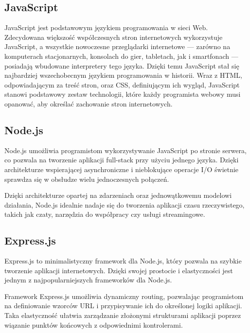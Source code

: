 \subsection{JavaScript}
JavaScript jest podstawowym językiem programowania w sieci Web. Zdecydowana większość współczesnych stron internetowych wykorzystuje JavaScript, a wszystkie nowoczesne przeglądarki internetowe — zarówno na komputerach stacjonarnych, konsolach do gier, tabletach, jak i smartfonach — posiadają wbudowane interpretery tego języka. Dzięki temu JavaScript stał się najbardziej wszechobecnym językiem programowania w historii. Wraz z HTML, odpowiadającym za treść stron, oraz CSS, definiującym ich wygląd, JavaScript stanowi podstawowy zestaw technologii, które każdy programista webowy musi opanować, aby określać zachowanie stron internetowych. \cite{flanagan2011javascript}


\subsection{Node.js}
Node.js umożliwia programistom wykorzystywanie JavaScript po stronie serwera, co pozwala na tworzenie aplikacji full-stack przy użyciu jednego języka. Dzięki architekturze wspierającej asynchroniczne i nieblokujące operacje I/O świetnie sprawdza się w obsłudze wielu jednoczesnych połączeń. \cite{peters2017building}

Dzięki architekturze opartej na zdarzeniach oraz jednowątkowemu modelowi działania, Node.js idealnie nadaje się do tworzenia aplikacji czasu rzeczywistego, takich jak czaty, narzędzia do współpracy czy usługi streamingowe. \cite{peters2017building}

\subsection{Express.js}
Express.js to minimalistyczny framework dla Node.js, który pozwala na szybkie tworzenie aplikacji internetowych. Dzięki swojej prostocie i elastyczności jest jednym z najpopularniejszych frameworków dla Node.js.

Framework Express.js umożliwia dynamiczny routing, pozwalając programistom na definiowanie wzorców URL i przypisywanie ich do określonej logiki aplikacji. Taka elastyczność ułatwia zarządzanie złożonymi strukturami aplikacji poprzez wiązanie punktów końcowych z odpowiednimi kontrolerami. \cite{peters2017building}
